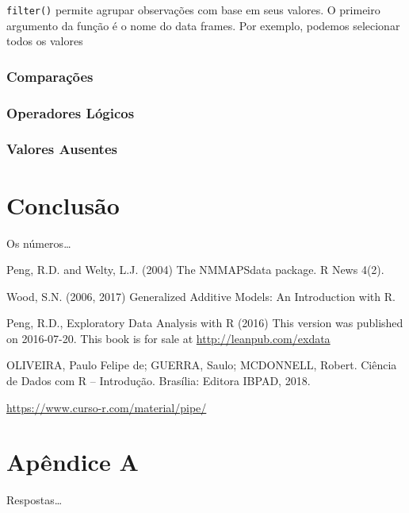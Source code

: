\documentclass[]{book}
\begin{document}
\texttt{filter()} permite agrupar observações com base em seus valores. O primeiro argumento da função é o nome do data frames. Por exemplo, podemos selecionar todos os valores

\hypertarget{comparauxe7uxf5es}{%
\subsection{Comparações}\label{comparauxe7uxf5es}}

\hypertarget{operadores-luxf3gicos}{%
\subsection{Operadores Lógicos}\label{operadores-luxf3gicos}}

\hypertarget{valores-ausentes}{%
\subsection{Valores Ausentes}\label{valores-ausentes}}

\hypertarget{summary}{%
\chapter{Conclusão}\label{summary}}

Os números\ldots{}

Peng, R.D. and Welty, L.J. (2004) The NMMAPSdata package. R News 4(2).

Wood, S.N. (2006, 2017) Generalized Additive Models: An Introduction with R.

Peng, R.D., Exploratory Data Analysis with R (2016) This version was published on 2016-07-20. This book is for sale at \url{http://leanpub.com/exdata}

OLIVEIRA, Paulo Felipe de; GUERRA, Saulo; MCDONNELL, Robert. Ciência de Dados com R -- Introdução. Brasília: Editora IBPAD, 2018.

\url{https://www.curso-r.com/material/pipe/}

\hypertarget{apuxeandice-a}{%
\chapter*{Apêndice A}\label{apuxeandice-a}}

Respostas\ldots{}


\end{document}
